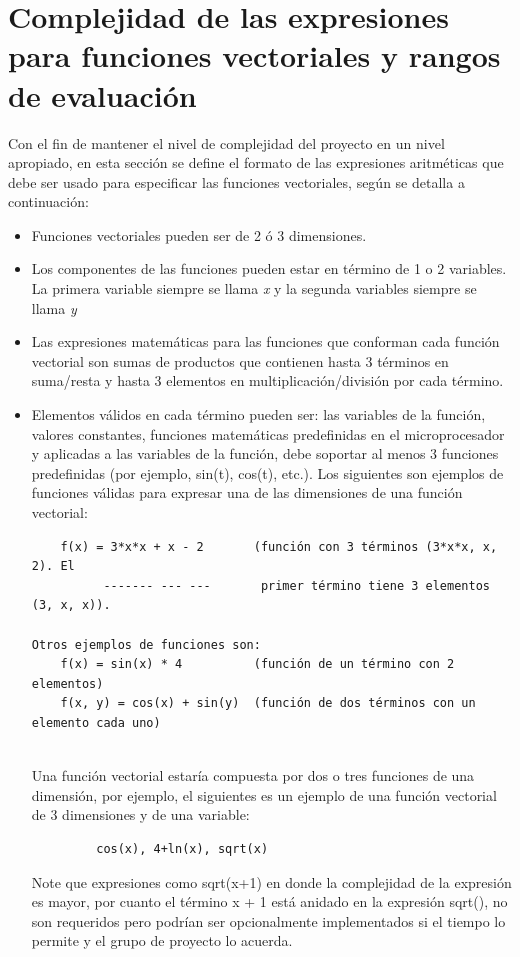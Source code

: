 \documentclass[12pt,letterpaper]{article}
\begin{document}
\section*{Complejidad de las expresiones para funciones vectoriales y rangos de evaluación}
Con el fin de mantener el nivel de complejidad del proyecto en un nivel apropiado, en esta sección se define el formato de las expresiones aritméticas que debe ser usado para especificar las funciones vectoriales, según se detalla a continuación:
\begin{itemize}
\item Funciones vectoriales pueden ser de 2 ó 3 dimensiones.
\item Los componentes de las funciones pueden estar en término de 1 o 2 variables. La primera variable siempre se llama \textit{x} y la segunda variables siempre se llama \textit{y}
\item Las expresiones matemáticas para las funciones que conforman cada función vectorial son sumas de productos que contienen hasta 3 términos en suma/resta y hasta 3 elementos en multiplicación/división por cada término.
\item Elementos válidos en cada término pueden ser: las variables de la función, valores constantes, funciones matemáticas predefinidas en el microprocesador y aplicadas a las variables de la función, debe soportar al menos 3 funciones predefinidas (por ejemplo, sin(t), cos(t), etc.).
Los siguientes son ejemplos de funciones válidas para expresar una de las dimensiones de una función vectorial:
\begin{verbatim}
    f(x) = 3*x*x + x - 2       (función con 3 términos (3*x*x, x, 2). El 
          ------- --- ---       primer término tiene 3 elementos (3, x, x)).
          
Otros ejemplos de funciones son:
    f(x) = sin(x) * 4          (función de un término con 2 elementos)
    f(x, y) = cos(x) + sin(y)  (función de dos términos con un elemento cada uno)
    
\end{verbatim} 

Una función vectorial estaría compuesta por dos o tres funciones de una dimensión, por ejemplo, el siguientes es un ejemplo de una función vectorial de 3 dimensiones y de una variable:
\begin{verbatim}
         cos(x), 4+ln(x), sqrt(x)
\end{verbatim}
Note que expresiones como sqrt(x+1) en donde la complejidad de la expresión es mayor, por cuanto el término x + 1 está anidado en la expresión sqrt(), no son requeridos pero podrían ser opcionalmente implementados si el tiempo lo permite y el grupo de proyecto lo acuerda.


\end{itemize}
\end{document}
